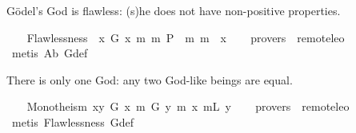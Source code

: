%
\begin{isabellebody}%
\def\isabellecontext{GoedelGodExtensions}%
%
\isadelimtheory
%
\endisadelimtheory
%
\isatagtheory
%
\endisatagtheory
{\isafoldtheory}%
%
\isadelimtheory
%
\endisadelimtheory
%
\isamarkuptrue%
%
\begin{isamarkuptext}%
G\"odel's God is flawless: (s)he does not have non-positive properties.%
\end{isamarkuptext}%
\isamarkuptrue%
\ \ \isamarkupfalse%
\ Flawlessness{\isacharcolon}\ {\isachardoublequoteopen}{\isacharbrackleft}{\isasymforall}{\isacharparenleft}{\isasymlambda}{\isasymPhi}{\isachardot}\ {\isasymforall}{\isacharparenleft}{\isasymlambda}x{\isachardot}\ {\isacharparenleft}G\ x\ m{\isasymrightarrow}\ {\isacharparenleft}m{\isasymnot}\ {\isacharparenleft}P\ {\isasymPhi}{\isacharparenright}\ m{\isasymrightarrow}\ m{\isasymnot}\ {\isacharparenleft}{\isasymPhi}\ x{\isacharparenright}{\isacharparenright}{\isacharparenright}{\isacharparenright}{\isacharparenright}{\isacharbrackright}{\isachardoublequoteclose}\isanewline
\ \ \isamarkupfalse%
\ {\isacharbrackleft}provers\ {\isacharequal}\ remote{\isacharunderscore}leo{}{\isacharbrackright}\ \isanewline
%
\isadelimproof
\ \ %
\endisadelimproof
%
\isatagproof
{}\isamarkupfalse%
\ {\isacharparenleft}metis\ A{}b\ G{\isacharunderscore}def{\isacharparenright}%
\endisatagproof
{\isafoldproof}%
%
\isadelimproof
%
\endisadelimproof
%
\begin{isamarkuptext}%
There is only one God: any two God-like beings are equal.%
\end{isamarkuptext}%
\isamarkuptrue%
\ \ \isamarkupfalse%
\ Monotheism{\isacharcolon}\ {\isachardoublequoteopen}{\isacharbrackleft}{\isasymforall}{\isacharparenleft}{\isasymlambda}x{\isachardot}{\isasymforall}{\isacharparenleft}{\isasymlambda}y{\isachardot}\ {\isacharparenleft}G\ x\ m{\isasymrightarrow}\ {\isacharparenleft}G\ y\ m{\isasymrightarrow}\ {\isacharparenleft}x\ mL{\isacharequal}\ y{\isacharparenright}{\isacharparenright}{\isacharparenright}{\isacharparenright}{\isacharparenright}{\isacharbrackright}{\isachardoublequoteclose}\isanewline
\ \ \isamarkupfalse%
\ {\isacharbrackleft}provers\ {\isacharequal}\ remote{\isacharunderscore}leo{}{\isacharbrackright}\isanewline
%
\isadelimproof
\ \ %
\endisadelimproof
%
\isatagproof
{}\isamarkupfalse%
\ {\isacharparenleft}metis\ Flawlessness\ G{\isacharunderscore}def{\isacharparenright}%
\endisatagproof
{\isafoldproof}%
%
\isadelimproof
%
\endisadelimproof
%
\isadelimtheory
%
\endisadelimtheory
%
\isatagtheory
%
\endisatagtheory
{\isafoldtheory}%
%
\isadelimtheory
%
\endisadelimtheory
\ \end{isabellebody}%
